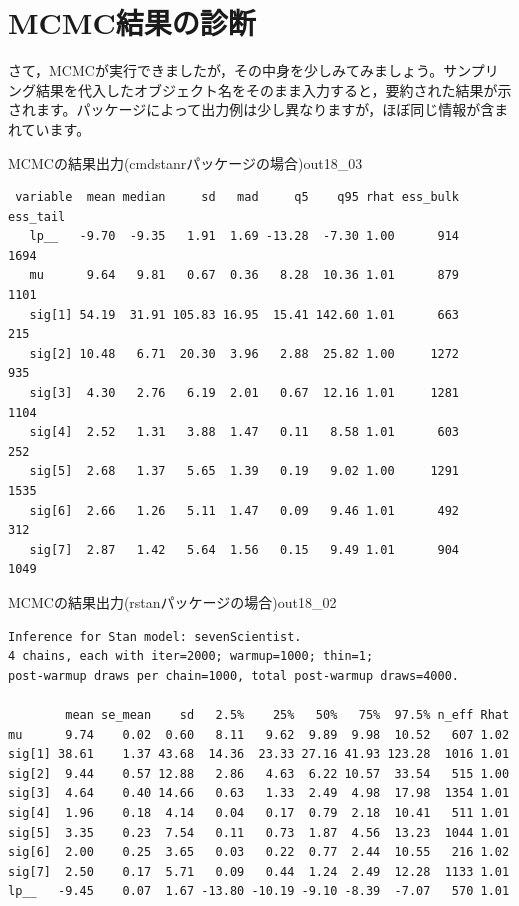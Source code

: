\documentclass{ltjsbook}
\begin{document}
\section{MCMC結果の診断}
さて，MCMCが実行できましたが，その中身を少しみてみましょう。サンプリング結果を代入したオブジェクト名をそのまま入力すると，要約された結果が示されます。パッケージによって出力例は少し異なりますが，ほぼ同じ情報が含まれています。

\begin{SCcmd}{MCMCの結果出力(cmdstanrパッケージの場合)}{out18_03}
	\begin{verbatim}
 variable  mean median     sd   mad     q5    q95 rhat ess_bulk ess_tail
   lp__   -9.70  -9.35   1.91  1.69 -13.28  -7.30 1.00      914     1694
   mu      9.64   9.81   0.67  0.36   8.28  10.36 1.01      879     1101
   sig[1] 54.19  31.91 105.83 16.95  15.41 142.60 1.01      663      215
   sig[2] 10.48   6.71  20.30  3.96   2.88  25.82 1.00     1272      935
   sig[3]  4.30   2.76   6.19  2.01   0.67  12.16 1.01     1281     1104
   sig[4]  2.52   1.31   3.88  1.47   0.11   8.58 1.01      603      252
   sig[5]  2.68   1.37   5.65  1.39   0.19   9.02 1.00     1291     1535
   sig[6]  2.66   1.26   5.11  1.47   0.09   9.46 1.01      492      312
   sig[7]  2.87   1.42   5.64  1.56   0.15   9.49 1.01      904     1049
    \end{verbatim}
\end{SCcmd}

\begin{SCrstan}{MCMCの結果出力(rstanパッケージの場合)}{out18_02}
	\begin{verbatim}
Inference for Stan model: sevenScientist.
4 chains, each with iter=2000; warmup=1000; thin=1; 
post-warmup draws per chain=1000, total post-warmup draws=4000.

        mean se_mean    sd   2.5%    25%   50%   75%  97.5% n_eff Rhat
mu      9.74    0.02  0.60   8.11   9.62  9.89  9.98  10.52   607 1.02
sig[1] 38.61    1.37 43.68  14.36  23.33 27.16 41.93 123.28  1016 1.01
sig[2]  9.44    0.57 12.88   2.86   4.63  6.22 10.57  33.54   515 1.00
sig[3]  4.64    0.40 14.66   0.63   1.33  2.49  4.98  17.98  1354 1.01
sig[4]  1.96    0.18  4.14   0.04   0.17  0.79  2.18  10.41   511 1.01
sig[5]  3.35    0.23  7.54   0.11   0.73  1.87  4.56  13.23  1044 1.01
sig[6]  2.00    0.25  3.65   0.03   0.22  0.77  2.44  10.55   216 1.02
sig[7]  2.50    0.17  5.71   0.09   0.44  1.24  2.49  12.28  1133 1.01
lp__   -9.45    0.07  1.67 -13.80 -10.19 -9.10 -8.39  -7.07   570 1.01
    \end{verbatim}
\end{SCrstan}
\end{document}
